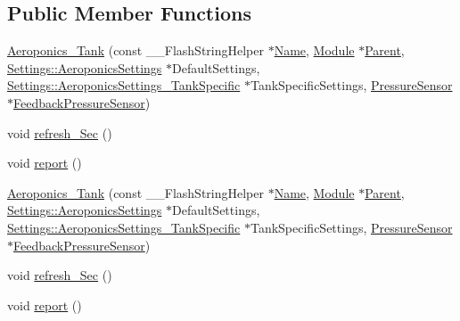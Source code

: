 \subsection*{Public Member Functions}
\begin{DoxyCompactItemize}
\item 
\hyperlink{class_aeroponics___tank_aab07821dc597c986608a886093e14ff7}{Aeroponics\+\_\+\+Tank} (const \+\_\+\+\_\+\+Flash\+String\+Helper $\ast$\hyperlink{class_common_aeea91a726dbe988e515057b32ba0726f}{Name}, \hyperlink{class_module}{Module} $\ast$\hyperlink{class_aeroponics_aa6bca341181caaa3ef15d10512d24c7b}{Parent}, \hyperlink{struct_settings_1_1_aeroponics_settings}{Settings\+::\+Aeroponics\+Settings} $\ast$Default\+Settings, \hyperlink{struct_settings_1_1_aeroponics_settings___tank_specific}{Settings\+::\+Aeroponics\+Settings\+\_\+\+Tank\+Specific} $\ast$Tank\+Specific\+Settings, \hyperlink{class_pressure_sensor}{Pressure\+Sensor} $\ast$\hyperlink{class_aeroponics_ab5e9a2fe86a36e1e84876eb1366a2bfb}{Feedback\+Pressure\+Sensor})
\item 
void \hyperlink{class_aeroponics___tank_a9b1c9377aec2a453e4562bca5ae7afa2}{refresh\+\_\+\+Sec} ()
\item 
void \hyperlink{class_aeroponics___tank_a45e50ca4e5d5a605d355d65c8cd3e5cd}{report} ()
\item 
\hyperlink{class_aeroponics___tank_aab07821dc597c986608a886093e14ff7}{Aeroponics\+\_\+\+Tank} (const \+\_\+\+\_\+\+Flash\+String\+Helper $\ast$\hyperlink{class_common_aeea91a726dbe988e515057b32ba0726f}{Name}, \hyperlink{class_module}{Module} $\ast$\hyperlink{class_aeroponics_aa6bca341181caaa3ef15d10512d24c7b}{Parent}, \hyperlink{struct_settings_1_1_aeroponics_settings}{Settings\+::\+Aeroponics\+Settings} $\ast$Default\+Settings, \hyperlink{struct_settings_1_1_aeroponics_settings___tank_specific}{Settings\+::\+Aeroponics\+Settings\+\_\+\+Tank\+Specific} $\ast$Tank\+Specific\+Settings, \hyperlink{class_pressure_sensor}{Pressure\+Sensor} $\ast$\hyperlink{class_aeroponics_ab5e9a2fe86a36e1e84876eb1366a2bfb}{Feedback\+Pressure\+Sensor})
\item 
void \hyperlink{class_aeroponics___tank_a9b1c9377aec2a453e4562bca5ae7afa2}{refresh\+\_\+\+Sec} ()
\item 
void \hyperlink{class_aeroponics___tank_a45e50ca4e5d5a605d355d65c8cd3e5cd}{report} ()
\end{DoxyCompactItemize}
